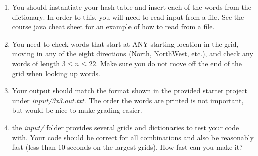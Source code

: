 \documentclass[paper=a4, fontsize=11pt, parskip=full]{scrartcl} %
\numberwithin{equation}{section} %
\numberwithin{figure}{section} %
\numberwithin{table}{section} %
\begin{document}
\begin{enumerate}
	\item You should instantiate your hash table and insert each of the words from the dictionary. In order to this, you will need to read input from a file. See the course \href{https://markfloryan.github.io/dsa1/java/javaCheatSheet/javaCheatSheet.pdf}{java cheat sheet} for an example of how to read from a file.
	\item You need to check words that start at ANY starting location in the grid, moving in any of the eight directions (North, NorthWest, etc.), and check any words of length $3 \leq n \leq 22$. Make sure you do not move off the end of the grid when looking up words.
	\item Your output should match the format shown in the provided starter project under \emph{input/3x3.out.txt}. The order the words are printed is not important, but would be nice to make grading easier.
	\item the \emph{input/} folder provides several grids and dictionaries to test your code with. Your code should be correct for all combinations and also be reasonably fast (less than 10 seconds on the largest grids). How fast can you make it?
\end{enumerate}



\end{document}

